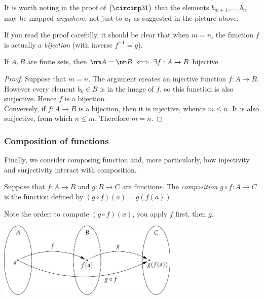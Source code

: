 \noindent It is worth noting in the proof of $\bigl(\circimp 31\bigr)$ that the elements $b_{m+1},\ldots,b_n$ may be mapped \emph{anywhere,} not just to $a_1$ as suggested in the picture above.

\noindent If you read the proof carefully, it should be clear that when $m=n$, the function $f$ is actually a \emph{bijection} (with inverse $f^{-1}=g$).


\begin{cor}\label{cor:finitecard}
If $A,B$ are finite sets, then $\nm A=\nm B\iff\exists f:A\to B$ bijective.
\end{cor}

\begin{proof}
Suppose that $m=n$. The argument  creates an injective function $f:A\to B$. However every element $b_k\in B$ is in the image of $f$, so this function is also surjective. Hence $f$ is a bijection.\\
Conversely, if $f:A\to B$ is a bijection, then it is injective, whence $m\le n$. It is also surjective, from which $n\le m$. Therefore $m=n$. 
\end{proof}\pagebreak


\subsubsection*{Composition of functions}

Finally, we consider composing function and, more particularly, how injectivity and surjectivity interact with composition.

\begin{defn}
Suppose that $f:A\to B$ and $g:B\to C$ are functions. The \emph{composition} $g\circ f:A\to C$ is the function defined by $(g\circ f)(a)=g(f(a))$.
\end{defn}
Note the order: to compute $(g\circ f)(x)$, you apply $f$ first, then $g$.

\begin{center}
\includegraphics[width=0.65\textwidth]{sets-15-setcomp}
\end{center}


